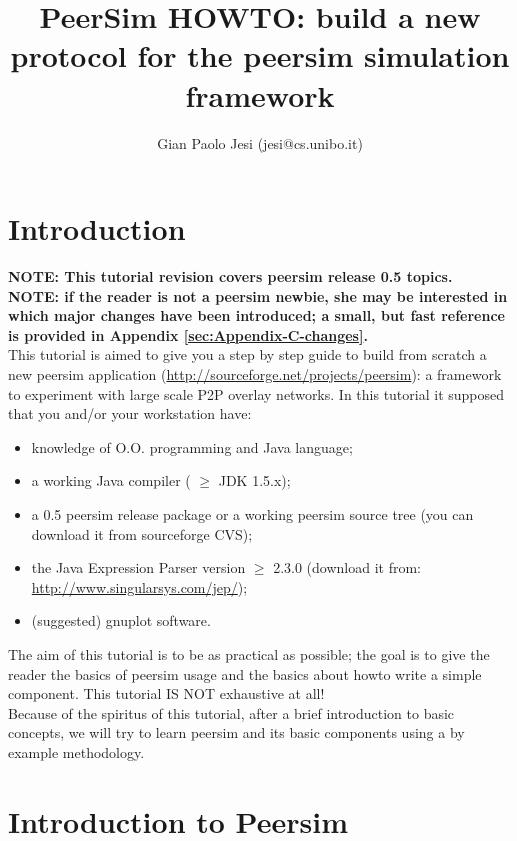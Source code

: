 \documentclass[a4paper,11pt]{article}
\title{PeerSim HOWTO: build a new protocol for the peersim simulation
framework}
\author{Gian Paolo Jesi (jesi@cs.unibo.it)}
\begin{document}
\maketitle



\section{Introduction}

\textbf{NOTE: This tutorial revision covers peersim release 0.5
  topics.}\\


\textbf{NOTE: if the reader is not a peersim newbie, she may be
  interested in which major changes have been introduced; a small, but
  fast reference is provided in Appendix \ref{sec:Appendix-C-changes}.}\\


This tutorial is aimed to give you a step by step guide to build from
scratch a new peersim application (\url{http://sourceforge.net/projects/peersim}):
a framework to experiment with large scale P2P overlay networks. In
this tutorial it supposed that you and/or your workstation have: 

\begin{itemize}
\item knowledge of O.O. programming and Java language;
\item a working Java compiler ( $\geq$ JDK 1.5.x);
\item a 0.5 peersim release package or a working peersim source tree
  (you can download it from sourceforge
 CVS);
\item the Java Expression Parser version $\geq$ 2.3.0 (download it from: \url{http://www.singularsys.com/jep/});
\item (suggested) gnuplot software. 
\end{itemize}

The aim of this tutorial is to be
as practical as possible; the goal is to give the reader the basics
of peersim usage and the basics about howto write a simple component.
This tutorial IS NOT exhaustive at all!\\
Because of the spiritus of this tutorial,
after a brief introduction to basic concepts, we will try to learn peersim 
and its basic components
using a by example methodology.


\section{Introduction to Peersim}
\end{document}
